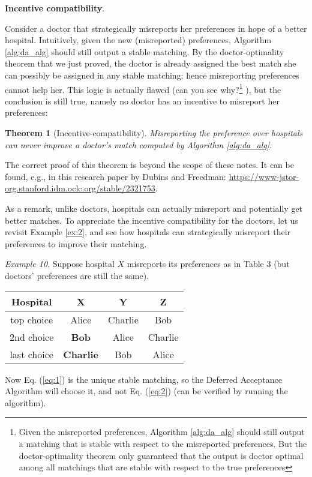 \documentclass [12pt]{article}
\newtheorem{theorem}{Theorem}
\theoremstyle{definition}
\begin{document}
\textbf{Incentive compatibility}. 

Consider a doctor that strategically misreports her preferences in hope of a better hospital. Intuitively, given the new (misreported) preferences, Algorithm \ref{alg:da_alg} should still output a stable matching. By the doctor-optimality theorem that we just proved, the doctor is already assigned the best match she can possibly be assigned in any stable matching; hence misreporting preferences cannot help her. This logic is actually flawed (can you see why?\footnote{Given the misreported preferences, Algorithm \ref{alg:da_alg} should still output a matching that is stable with respect to the misreported preferences. But the doctor-optimality theorem only guaranteed that the output is doctor optimal among all matchings that are stable with respect to the true preferences} ), but the conclusion is still true, namely no doctor has an incentive to misreport her preferences: 


\begin{theorem}[Incentive-compatibility]
Misreporting the preference over hospitals can never improve a doctor’s match computed by Algorithm \ref{alg:da_alg}.
\end{theorem}

The correct proof of this theorem is beyond the scope of these notes. It can be found, e.g., in this research paper by Dubins and Freedman: \href{https://www-jstor-org.stanford.idm.oclc.org/stable/2321753}{https://www-jstor-org.stanford.idm.oclc.org/stable/2321753}.

As a remark, unlike doctors, hospitals can actually misreport and potentially get better
matches. To appreciate the incentive compatibility for the doctors, let us revisit Example \ref{ex:2}, and see how hospitals can strategically misreport their preferences to improve their matching.

\textit{Example 10}. Suppose hospital $X$ misreports its preferences as in Table 3 (but doctors' preferences are still the same).

\begin{table}[h!]
\begin{tabular}{|c|c|c|c|}
\hline Hospital & X & Y & Z \\
\hline top choice & Alice & Charlie & Bob \\
2nd choice & \textbf{Bob} & Alice & Charlie \\
last choice & \textbf{Charlie} & Bob & Alice \\
\hline
\end{tabular}
\end{table}

Now Eq. (\ref{eq:1}) is the unique stable matching, so the Deferred Acceptance Algorithm will choose it, and not Eq. (\ref{eq:2}) (can be verified by running the algorithm).
\end{document}
